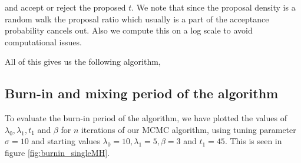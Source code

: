 and accept or reject the proposed $t$. We note that since the proposal density is a random walk the proposal ratio which usually is a part of the acceptance probability cancels out. Also we compute this on a log scale to avoid computational issues.

All of this gives us the following algorithm, 



\subsection{Burn-in and mixing period of the algorithm}

To evaluate the burn-in period of the algorithm, we have plotted the values of $\lambda_0, \lambda_1, t_1$ and $\beta$ for $n$ iterations of our MCMC algorithm, using tuning parameter $\sigma = 10$ and starting values $\lambda_0 = 10, \lambda_1 = 5, \beta = 3$ and $t_1 = 45$. This is seen in figure \ref{fig:burnin_singleMH}. 


